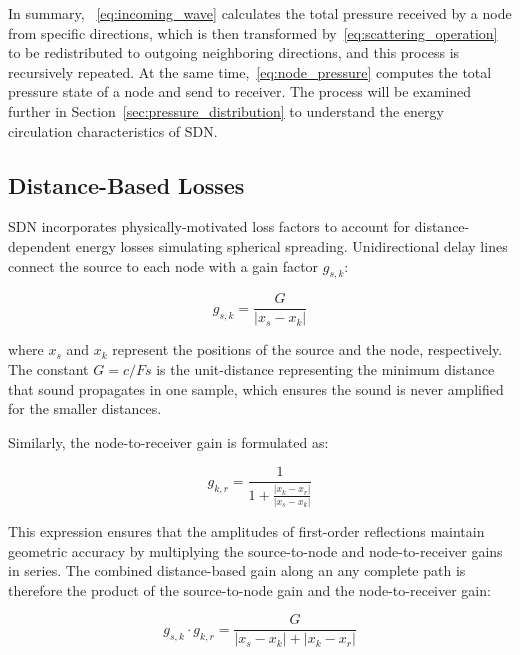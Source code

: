 \documentclass[journal]{IEEEtran}
\begin{document}
In summary, ~\eqref{eq:incoming_wave} calculates the total pressure received by a node from specific directions, which is then transformed by~\eqref{eq:scattering_operation} to be redistributed to outgoing neighboring directions, and this process is recursively repeated. At the same time,~\eqref{eq:node_pressure} computes the total pressure state of a node and send to receiver. The process will be examined further in Section~\ref{sec:pressure_distribution} to understand the energy circulation characteristics of SDN.


\subsection{Distance-Based Losses}
\label{sec:distance_based_attenuations}

SDN incorporates physically-motivated loss factors to account for distance-dependent
energy losses simulating spherical spreading. Unidirectional delay lines
connect the source to each node with a gain factor \(g_{s,k}\):

\begin{equation}
\label{eq:source_node_gain}
g_{s,k} = \frac{G}{|x_s - x_k|}
\end{equation}

where \(x_s\) and \(x_k\) represent the positions of the source and the
node, respectively. The constant \(G = c/Fs\) is the unit-distance
representing the minimum distance that sound propagates in one sample,
which ensures the sound is never amplified for the smaller distances. 

Similarly, the node-to-receiver gain is formulated as:

\begin{equation}
\label{eq:node_receiver_gain}
g_{k,r} = \frac{1}{1 + \frac{|x_k - x_r|}{|x_s - x_k|}}
\end{equation}

This expression ensures that the amplitudes of first-order reflections
maintain geometric accuracy by multiplying the source-to-node and node-to-receiver gains in series. The
combined distance-based gain along an any complete path is therefore the
product of the source-to-node gain and the node-to-receiver gain:

\begin{equation}
\label{eq:combined_gain}
g_{s,k} \cdot g_{k,r} = \frac{G}{|x_s - x_k| + |x_k - x_r|}
\end{equation}


\end{document}
